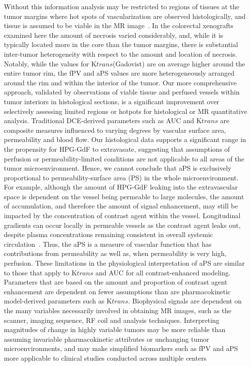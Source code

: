Without this information analysis may be restricted to regions of tissues at the tumor margins where hot spots of vascularization are observed histologically, and tissue is assumed to be viable in the MR image~\cite{Pathak:2005gu,Li:2005gw}.
In the colorectal xenografts examined here the amount of necrosis varied considerably, and, while it is typically located more in the core than the tumor margins, there is substantial inter-tumor heterogeneity with respect to the amount and location of necrosis.
Notably, while the values for K${trans}$(Gadovist) are on average higher around the entire tumor rim, the fPV and aPS values are more heterogeneously arranged around the rim and within the interior of the tumor.
Our more comprehensive approach, validated by observations of viable tissue and perfused vessels within tumor interiors in histological sections, is a significant improvement over selectively assessing limited regions or hotpots for histological or MR quantitative analysis.
Traditional DCE-derived parameters such as AUC and K${trans}$ are composite measures influenced to varying degrees by vascular surface area, permeability and blood flow.
Our histological data supports a significant range in the propensity for HPG-GdF to extravasate, suggesting that assumptions of perfusion or permeability-limited conditions are not applicable to all areas of the tumor microenvironment.
Hence, we cannot conclude that aPS is exclusively proportional to permeability-surface area (PS) in the whole microenvironment.
For example, although the amount of HPG-GdF leaking into the extravascular space is dependent on the vessel being permeable to large molecules, the amount of accumulation, and therefore the amount of signal enhancement, may still be impacted by the concentration of contrast agent within the vessel.
Longitudinal gradients can occur locally in permeable vessels as the contrast agent leaks out, despite plasma concentrations remaining consistent in overall systemic circulation~\cite{Erickson:2003wt,Dewhirst:1999jh}.
Thus, the aPS is a measure of vascular function that has contributions from permeability as well as, when permeability is very high, perfusion.
These limitations in the physiological interpretation of aPS are similar to those that apply to K${trans}$ and AUC for all contrast-enhanced modeling.
Parameters that are based on the amount and proportion of contrast agent enhancement are dependent on fewer assumptions than are pharmacokinetic model-derived parameters such as K${trans}$.
Biophysical signals are dependent on the many variables necessarily involved in obtaining MR images, such as the scanner, imaging sequence, RF coil and analysis techniques.
Interpreting magnitudes of change in highly variable tumors may be more reliable than assuming invariable pharmacokinetic attributes or unchanging tumor microenvironments, and may make simplified biomarkers such as fPV and aPS more applicable to clinical studies conducted across multiple centers~\cite{OConnor:2012ie}

